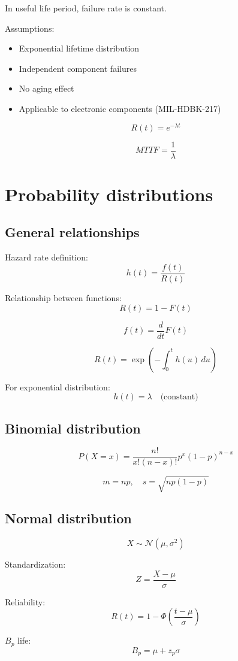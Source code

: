 \documentclass[10pt,a4paper,twocolumn]{article}
\begin{document}
In useful life period, failure rate is constant.

Assumptions:
\begin{itemize}
\item Exponential lifetime distribution
\item Independent component failures
\item No aging effect
\item Applicable to electronic components (MIL-HDBK-217)
\end{itemize}

\[R(t)=e^{-\lambda t}\]

\[MTTF=\frac{1}{\lambda}\]


\section*{Probability distributions}

\subsection*{General relationships}

Hazard rate definition:
\[
h(t)=\frac{f(t)}{R(t)}
\]

Relationship between functions:
\[R(t)=1-F(t)\]

\[f(t)=\frac{d}{dt}F(t)\]

\[R(t)=\exp\left(-\int_0^t h(u)\,du\right)\]

For exponential distribution:
\[h(t)=\lambda \quad \text{(constant)}\]


\subsection*{Binomial distribution}

\[P(X=x)=\frac{n!}{x!(n-x)!}p^x(1-p)^{n-x}\]

\[m=np,\quad s=\sqrt{np(1-p)}\]
\subsection*{Normal distribution}

\[X \sim \mathcal{N}(\mu,\sigma^2)\]

Standardization:
\[Z=\frac{X-\mu}{\sigma}\]

Reliability:
\[R(t)=1-\Phi\left(\frac{t-\mu}{\sigma}\right)\]

$B_p$ life:
\[B_p=\mu+z_p\sigma\]
\end{document}
